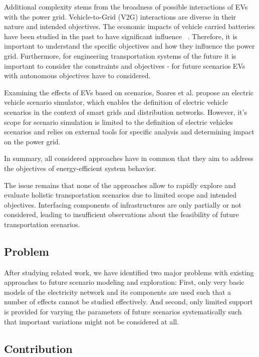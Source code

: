 Additional complexity stems from the broadness of possible interactions of EVs with the power grid. Vehicle-to-Grid (V2G) interactions are diverse in their nature and intended objectives. The economic impacts of vehicle carried batteries have been studied in the past to have significant influence ~\cite{peterson2010economics,erdinc2014economic}. Therefore, it is important to understand the specific objectives and how they influence the power grid. Furthermore, for engineering transportation systems of the future it is important to consider the constraints and objectives - for future scenarios EVs with autonomous objectives have to considered.

Examining the effects of EVs based on scenarios, Soares et al. \cite{soares2012electric} propose an electric vehicle scenario simulator, which enables the definition of electric vehicle scenarios in the context of smart grids and distribution networks. However, it's scope for scenario simulation is limited to the definition of electric vehicles scenarios and relies on external tools for specific analysis and determining impact on the power grid.

In summary, all considered approaches have in common that they aim to address the objectives of energy-efficient system behavior.

The issue remains that none of the approaches allow to rapidly explore and evaluate holistic transportation scenarios due to limited scope and intended objectives. Interfacing components of infrastructures are only partially or not considered, leading to insufficient observations about the feasibility of future transportation scenarios.

\subsection{Problem}

After studying related work, we have identified two major problems with existing approaches to future scenario modeling and exploration: First, only very basic models of the electricity network and its components are used such that a number of effects cannot be studied effectively. And second, only limited support is provided for varying the parameters of future scenarios systematically such that important variations might not be considered at all.

\subsection{Contribution}

